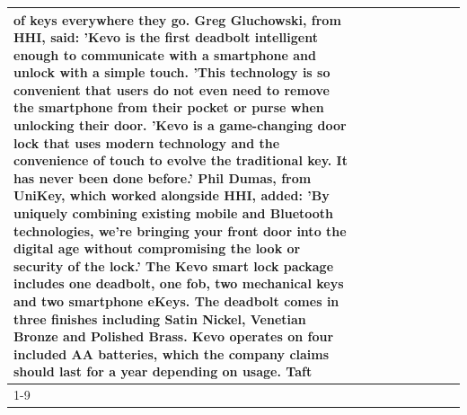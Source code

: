 \begin{table}[H]
\begin{tabular}{lllrlllll}
of keys everywhere they go. Greg Gluchowski, from HHI, said: 'Kevo is the first deadbolt intelligent enough to communicate with a smartphone and unlock with a simple touch. 'This technology is so convenient that users do not even need to remove the smartphone from their pocket or purse when unlocking their door. 'Kevo is a game-changing door lock that uses modern technology and the convenience of touch to evolve the traditional key. It has never been done before.' Phil Dumas, from UniKey, which worked alongside HHI, added: 'By uniquely combining existing mobile and Bluetooth technologies, we’re bringing your front door into the digital age without compromising the look or security of the lock.' The Kevo smart lock package includes one deadbolt, one fob, two mechanical keys and two smartphone eKeys. The deadbolt comes in three finishes including Satin Nickel, Venetian Bronze and Polished Brass. Kevo operates on four included AA batteries, which the company claims should last for a year depending on usage. Taft \\
\cline{1-9}

\end{tabular}
\end{table}
